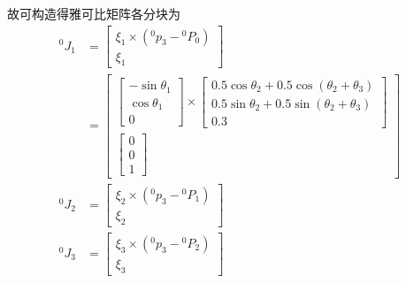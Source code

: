 \documentclass[UTF8, 13pt]{ctexart}
\begin{document}
故可构造得雅可比矩阵各分块为
\[
\begin{aligned}
    {}^0 J_1 &= \begin{bmatrix}
                    \xi_1 \times ({}^0 p_3 - {}^0 P_0) \\ \xi_1
                \end{bmatrix} \\
            &= \begin{bmatrix}
                    \begin{bmatrix}
                        -\sin\theta_1 \\ \cos\theta_1 \\ 0
                    \end{bmatrix} \times
                    \begin{bmatrix}
                        0.5 \cos\theta_2 + 0.5 \cos(\theta_2 + \theta_3) \\
                        0.5 \sin\theta_2 + 0.5 \sin(\theta_2 + \theta_3) \\
                        0.3
                    \end{bmatrix} \\
                    \begin{bmatrix}
                        0 \\ 0 \\ 1
                    \end{bmatrix}
                \end{bmatrix} \\
    {}^0 J_2 &= \begin{bmatrix}
                    \xi_2 \times ({}^0 p_3 - {}^0 P_1) \\ \xi_2
                \end{bmatrix} \\
    {}^0 J_3 &= \begin{bmatrix}
                    \xi_3 \times ({}^0 p_3 - {}^0 P_2) \\ \xi_3
                \end{bmatrix} \\
\end{aligned}
\]
\end{document}
